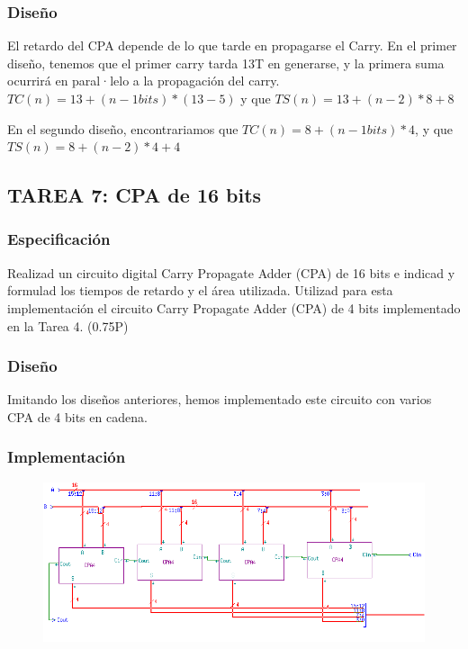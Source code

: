 \documentclass{article}
\begin{document}
		\subsubsection*{Diseño}
		El retardo del CPA depende de lo que tarde en propagarse el Carry. En el primer diseño, tenemos que el primer carry tarda 13T en generarse, y la primera suma ocurrirá en paral·lelo a la propagación del carry. $ TC(n) = 13 + (n-1 bits) * (13-5) $ y que $ TS(n) = 13 + (n-2)*8 + 8 $
		
		En el segundo diseño, encontrariamos que $ TC(n) = 8 + (n-1 bits)*4 $, y que $ TS(n) = 8 + (n-2)*4+4 $	
	\subsection{TAREA 7: CPA de 16 bits}
		\subsubsection*{Especificación}
		Realizad un circuito digital Carry Propagate Adder (CPA) de 16 bits e indicad y
		formulad los tiempos de retardo y el área utilizada. Utilizad para esta implementación el circuito
		Carry Propagate Adder (CPA) de 4 bits implementado en la Tarea 4. (0.75P)

		\subsubsection*{Diseño}
		Imitando los diseños anteriores, hemos implementado este circuito con varios CPA de 4 bits en cadena.

		\subsubsection*{Implementación}
		 \begin{figure}[ht]
			\includegraphics[width=0.8\linewidth]{CPA16}
		 	\centering
		 \end{figure}
\end{document}
